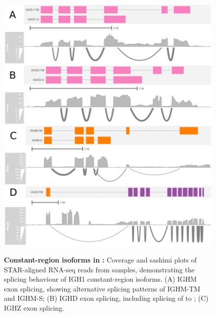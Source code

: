 \begin{figure}
	\includegraphics[width=\textwidth]{_Figures/png/xma-new-locus-sashimi}
	    \begin{subfigure}{0em}
        \label{fig:xma-locus-sashimi-z1}
    \end{subfigure}
    \begin{subfigure}{0em}
        \label{fig:xma-locus-sashimi-z2}
    \end{subfigure}
	\begin{subfigure}{0em}
        \label{fig:xma-locus-sashimi-m}
    \end{subfigure}
    \begin{subfigure}{0em}
        \label{fig:xma-locus-sashimi-d}
    \end{subfigure}
	\caption[Constant-region isoforms in \Xma]{\textbf{Constant-region isoforms in \Xma:} Coverage and sashimi plots of STAR-aligned RNA-seq reads from \Xma samples, demonstrating the splicing behaviour of IGH1 constant-region isoforms. (A) IGHM exon splicing, showing alternative splicing patterns of IGHM-TM and IGHM-S; (B) IGHD exon splicing, including splicing of  to ; (C) IGHZ exon splicing.}
	\label{fig:xma-locus-sashimi}
	\end{figure}

